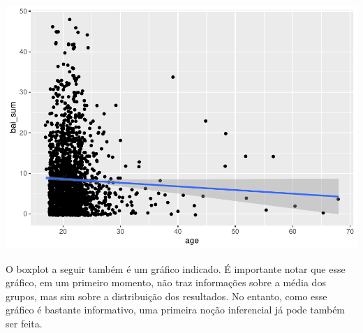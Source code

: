 \documentclass[
]{book}
\newenvironment{Shaded}{\begin{snugshade}}{\end{snugshade}}
\newcommand{\DataTypeTok}[1]{\textcolor[rgb]{0.13,0.29,0.53}{#1}}
\newcommand{\FloatTok}[1]{\textcolor[rgb]{0.00,0.00,0.81}{#1}}
\newcommand{\KeywordTok}[1]{\textcolor[rgb]{0.13,0.29,0.53}{\textbf{#1}}}
\newcommand{\NormalTok}[1]{#1}
\newcommand{\OperatorTok}[1]{\textcolor[rgb]{0.81,0.36,0.00}{\textbf{#1}}}
\newcommand{\StringTok}[1]{\textcolor[rgb]{0.31,0.60,0.02}{#1}}
\begin{document}
\begin{Shaded}
\end{Shaded}

\begin{center}\includegraphics{gitbook-demo_files/figure-latex/unnamed-chunk-24-1} \end{center}

O boxplot a seguir também é um gráfico indicado. É importante notar que esse gráfico, em um primeiro momento, não traz informações sobre a média dos grupos, mas sim sobre a distribuição dos resultados. No entanto, como esse gráfico é bastante informativo, uma primeira noção inferencial já pode também ser feita.

\begin{Shaded}
\end{Shaded}
\end{document}
